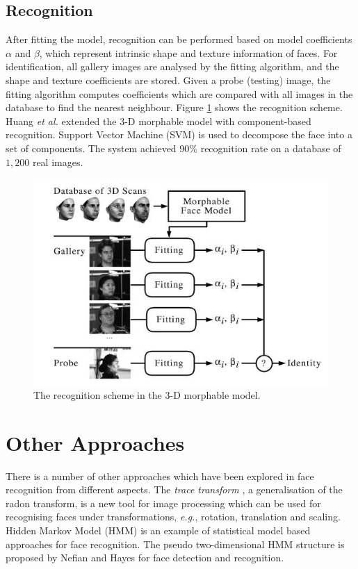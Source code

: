 \subsection{Recognition}
After fitting the model, recognition can be performed based on model coefficients $\alpha$ and $\beta$, which represent intrinsic shape and texture information of faces. For identification, all gallery images are analysed by the fitting algorithm, and the shape and texture coefficients are stored. Given a probe (testing) image, the fitting algorithm computes coefficients which are compared with all images in the database to find the nearest neighbour. \mbox{Figure} \ref{fig:3DMMrecognition} shows the recognition scheme. Huang \textit{et al.} \cite{Huang2003} extended the 3-D morphable model with component-based recognition. Support Vector Machine (SVM) is used to decompose the face into a set of components. The system achieved $90\%$ recognition rate on a database of $1,200$ real images.
\begin{figure}[t]
 \begin{center}
  \includegraphics[width=0.77\columnwidth]{ch2/figures/3DMMrecognition.jpg}
  \caption{The recognition scheme in the 3-D morphable model. \cite{Blanz2003}}
  \label{fig:3DMMrecognition}
 \end{center}
\end{figure} 

\section{Other Approaches}
\label{sec:others}
There is a number of other approaches which have been explored in face recognition from different aspects. 
The \textit{trace transform} \cite{Kadyrov2001}, a generalisation of the radon transform, is a new tool for image processing which can be used for recognising faces \cite{Srisuk2003,Srisuk2003EE} under transformations, \textit{e.g.}, rotation, translation and scaling. Hidden Markov Model (HMM) \cite{Nefian1998} is an example of statistical model based approaches for face recognition. The pseudo two-dimensional HMM structure is proposed by Nefian and Hayes \cite{Nefian2000} for face detection and recognition.

